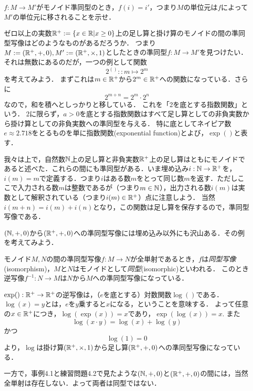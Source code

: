 \documentclass[11pt,a4paper]{jsarticle}
\begin{document}
\begin{exercise}
    $f:M \to M'$がモノイド準同型のとき，$f(i) = i'$，つまり$M$の単位元は$f$によって$M'$の単位元に移されることを示せ．
\end{exercise}

ゼロ以上の実数$\mathbb{R}^+ := \{x \in \mathbb{R} | x \geq 0 \}$上の足し算と掛け算のモノイドの間の準同型写像はどのようなものがあるだろうか．
つまり$M := (\mathbb{R}^+, +, 0), M' := (\mathbb{R}^+, \times, 1)$としたときの準同型$f:M \to M'$を見つけたい．
それは無数にあるのだが，一つの例として関数
\[ 2^{()} :: m \mapsto 2^m \]
を考えてみよう．
まずこれは$m \in \mathbb{R}^+$から$2^m \in \mathbb{R}^+$への関数になっている．さらに
\[ 2^{m + n} = 2^m \cdot 2^n \]
なので，和を積へとしっかりと移している．
これを「2を底とする指数関数」という．
2に限らず，$a>0$を底とする指数関数はすべて足し算としての非負実数から掛け算としての非負実数への準同型を与える．
特に底としてネイピア数$e\approx 2.718$をとるものを単に指数関数(exponential function)とよび，$\exp()$と表す．

\begin{example}
    我々は上で，自然数$\mathbb{N}$上の足し算と非負実数$\mathbb{R}^+$上の足し算はともにモノイドであると述べた．これらの間にも準同型がある．いま埋め込み$i:\mathbb{N} \to \mathbb{R}^+$を，$i(m)=m$で定義する．つまり$i$はある数$m$をとって同じ数$m$を返す．ただしここで入力される数$m$は整数であるが（つまり$m \in \mathbb{N}$），出力される数$i(m)$は実数として解釈されている（つまり$i(m) \in \mathbb{R}^+$）点に注意しよう．
    当然$i(m+n) = i(m)+i(n)$となり，この関数は足し算を保存するので，準同型写像である．
\end{example} 

\begin{exercise}
    $(\mathbb{N}, +, 0)$から$(\mathbb{R}^+, +, 0)$への準同型写像には埋め込み以外にも沢山ある．その例を考えてみよう．
\end{exercise}


\begin{dfn}[同型]
    モノイド$M, N$の間の準同型写像$f:M \to N$が全単射であるとき，$f$は\emph{同型写像}(isomorphism)，$M$と$N$はモノイドとして\emph{同型}(isomorphic)といわれる．
    このとき逆写像$f^{-1}:N \to M$は$N$から$M$への準同型写像になっている．
\end{dfn}

\begin{example}
    $\exp():\mathbb{R}^+ \to \mathbb{R}^+$の逆写像は，（$e$を底とする）対数関数$\log()$である．
    $\log(x)=y$とは，$e$を$y$乗すると$x$になる，ということを意味する．
    よって任意の$x\in\mathbb{R}^+$につき，$\log(\exp(x))=x$であり，$\exp(\log(x))=x$. また
    \[ \log(x \cdot y) = \log(x) + \log(y) \]
    かつ
    \[ \log(1) = 0 \]
    より，$\log$は掛け算$(\mathbb{R}^+, \times, 1)$から足し算$(\mathbb{R}^+, +, 0)$への準同型写像になっている．

    一方で，事例4.1と練習問題4.2で見たような$(\mathbb{N}, +, 0)$と$(\mathbb{R}^+, +, 0)$の間には，当然全単射は存在しない．よって両者は同型ではない．
\end{example}
\end{document}
